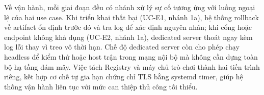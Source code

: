 \documentclass[../DoAn.tex]{subfiles}
\begin{document}
Về vận hành, mỗi giai đoạn đều có nhánh xử lý sự cố tương ứng với luồng ngoại lệ của hai use case.
Khi triển khai thất bại (UC-E1, nhánh 1a), hệ thống rollback về artifact ổn định trước đó và tra
log để xác định nguyên nhân; khi cổng hoặc endpoint không khả dụng (UC-E2, nhánh 1a), dedicated
server thoát ngay kèm log lỗi thay vì treo vô thời hạn. Chế độ dedicated server còn cho phép chạy
headless để kiểm thử hoặc host trận trong mạng nội bộ mà không cần dựng toàn bộ hạ tầng đám mây.
Việc tách Registry và máy chủ trò chơi thành hai tiến trình riêng, kết hợp cơ chế tự gia hạn chứng
chỉ TLS bằng systemd timer, giúp hệ thống vận hành liên tục với mức can thiệp thủ công tối thiểu.
\end{document}
